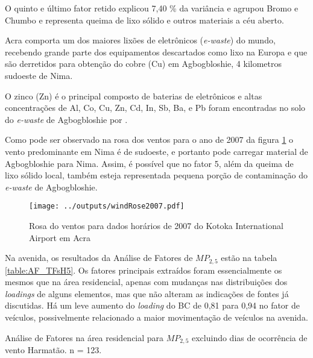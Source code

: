O quinto e último fator retido explicou 7,40 \% da variância e agrupou
Bromo e Chumbo e representa queima de lixo sólido e outros materiais a céu 
aberto. 

Acra comporta um dos maiores lixões de eletrônicos (\textit{e-waste}) 
do mundo, recebendo grande parte dos equipamentos descartados como lixo na 
Europa e que são derretidos para obtenção do cobre (Cu) em Agbogbloshie, 
4 kilometros sudoeste de Nima.  

O zinco (Zn) é o principal composto de baterias de eletrônicos e altas 
concentrações de Al, Co, Cu, Zn, Cd, In, Sb, Ba, e Pb foram encontradas
no solo do \textit{e-waste} de Agbogbloshie por \citet{asante2012}. 

Como pode ser observado na rosa dos ventos para o ano de 2007 
da figura \ref{fg:rosa2007} o vento predominante em Nima é de sudoeste, 
e portanto pode carregar material de Agbogbloshie para Nima. 
Assim, é possível que no fator 5, além da queima de lixo sólido local, 
também esteja representada pequena porção de contaminação do 
\textit{e-waste} de Agbogbloshie.

\begin{figure}[H]
  \centering
  \texttt{[image: ../outputs/windRose2007.pdf]}
  \caption{Rosa do ventos para dados horários de 2007 do 
           Kotoka International Airport em Acra 
           \label{fg:rosa2007}}
\end{figure}%


Na avenida, os resultados da Análise de Fatores de $MP_{2,5}$ estão na 
tabela \ref{table:AF_TFsH5}. Os fatores principais extraídos 
foram essencialmente os mesmos que na área residencial, apenas com mudanças nas
distribuições dos \textit{loadings} de alguns elementos, mas que não alteram 
as indicações de fontes já discutidas. Há um leve aumento do \textit{loading} 
do BC de 0,81 para 0,94 no fator de veículos, possivelmente relacionado a
maior movimentação de veículos na avenida.

\newpage
\begin{table}[H]
  \centering
  
  \caption{Análise de Fatores na área residencial para $MP_{2,5}$
           excluindo dias de ocorrência de vento Harmatão. n = 123.
          \label{table:AF_RFsH5}}
\end{table}

